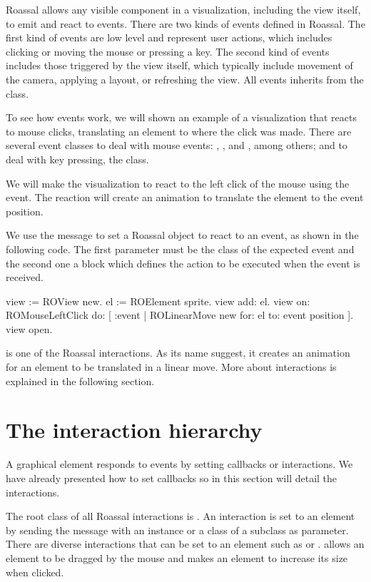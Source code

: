 \documentclass[a4paper,10pt,twoside]{book}
\begin{document}
Roassal allows any visible component in a visualization, including the view itself, to emit and react to events. There are two kinds of events defined in Roassal. The first kind of events are low level and represent user actions, which includes clicking or moving the mouse or pressing a key. The second kind of events includes those triggered by the view itself, which typically include movement of the camera, applying a layout, or refreshing the view. All events inherits from the  class.

To see how events work, we will shown an example of a visualization that reacts to mouse clicks, translating an element to where the click was made. 
There are several event classes to deal with mouse events: , ,  and , among others; and to deal with key pressing, the  class.

We will make the visualization to react to the left click of the mouse using the  event. The reaction will create an animation to translate the element to the event position.

We use the  message to set a Roassal object to react to an event, as shown in the following code. The first parameter must be the class of the expected event and the second one a block which defines the action to be executed when the event is received.

\begin{code}{}
view := ROView new.
el := ROElement sprite.
view add: el.
view 
	on: ROMouseLeftClick 
	do: [ :event | ROLinearMove new for: el to: event position ].
view open. 
\end{code}


 is one of the Roassal interactions. As its name suggest, it creates an animation for an element to be translated in a linear move. More about interactions is explained in the following section.

\section{The interaction hierarchy} 

A graphical element responds to events by setting callbacks or interactions. We have already presented how to set callbacks so in this section will detail the interactions. 

The root class of all Roassal interactions is . An interaction is set to an element by sending the  message with an instance or a class of a subclass  as parameter. There are diverse interactions that can be set to an element such as    or .
 allows an element to be dragged by the mouse and  makes an element to increase its size when clicked. 
\end{document}
